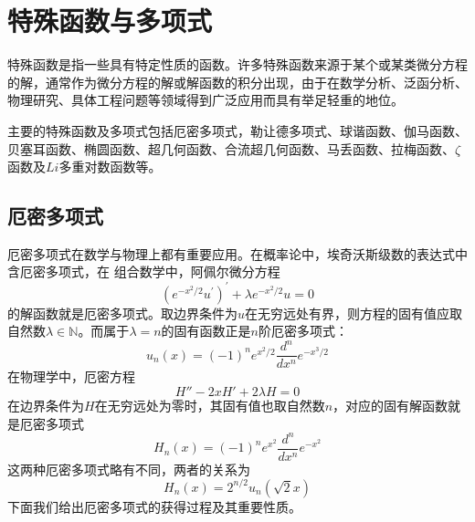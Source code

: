 \chapter{特殊函数与多项式}
特殊函数是指一些具有特定性质的函数。许多特殊函数来源于某个或某类微分方程的解，通常作为微分方程的解或解函数的积分出现，由于在数学分析、泛函分析、物理研究、具体工程问题等领域得到广泛应用而具有举足轻重的地位。

主要的特殊函数及多项式包括厄密多项式，勒让德多项式、球谐函数、伽马函数、贝塞耳函数、椭圆函数、超几何函数、合流超几何函数、马丢函数、拉梅函数、$\zeta$函数及$Li$多重对数函数等。

\section{厄密多项式}
厄密多项式在数学与物理上都有重要应用。在概率论中，埃奇沃斯级数的表达式中含厄密多项式，在
组合数学中，阿佩尔微分方程
\begin{equation}
	\left(e^{-x^{2} / 2} u^{\prime}\right)^{\prime}+\lambda e^{-x^{2} / 2} u=0
\end{equation}
的解函数就是厄密多项式。取边界条件为$u$在无穷远处有界，则方程的固有值应取自然数$\lambda \in \mathbb{N}$。而属于$\lambda = n$的固有函数正是$n$阶厄密多项式： 
\begin{equation}
	u_{n}(x)=(-1)^{n} e^{x^{2} / 2} \frac{d^{n}}{d x^{n}} e^{-x^{3} / 2}
\end{equation}
在物理学中，厄密方程 
\begin{equation}
	H'' -2 x H' +2\lambda H=0 
\end{equation}
在边界条件为$H$在无穷远处为零时，其固有值也取自然数$n$，对应的固有解函数就是厄密多项式
\begin{equation}
	H_{n}(x)=(-1)^{n} e^{x^{2}} \frac{d^{n}}{d x^{n}} e^{-x^{2}}
\end{equation}
这两种厄密多项式略有不同，两者的关系为
\begin{equation}
	H_{n}(x) = 2^{n/2} u_n(\sqrt{2}x)
\end{equation}
下面我们给出厄密多项式的获得过程及其重要性质。
	 
